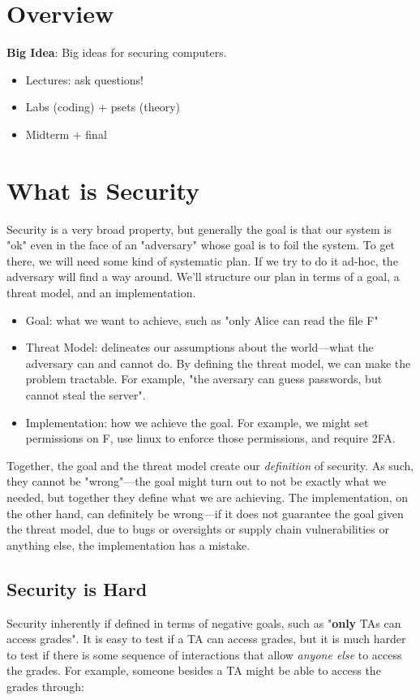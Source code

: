 \section{Overview}
\textbf{Big Idea}: Big ideas for securing computers.
\begin{itemize}
	\item Lectures: ask questions!
	\item Labs (coding) + psets (theory)
	\item Midterm + final
\end{itemize}

\section{What is Security}
Security is a very broad property, but generally the goal is that our system is "ok" even in the face of an "adversary" whose goal is to foil the system. To get there, we will need some kind of systematic plan. If we try to do it ad-hoc, the adversary will find a way around. We'll structure our plan in terms of a goal, a threat model, and an implementation.

\begin{itemize}
	\item Goal: what we want to achieve, such as "only Alice can read the file F"
	\item Threat Model: delineates our assumptions about the world---what the adversary can and cannot do. By defining the threat model, we can make the problem tractable. For example, "the aversary can guess passwords, but cannot steal the server".
	\item Implementation: how we achieve the goal. For example, we might set permissions on F, use linux to enforce those permissions, and require 2FA.
\end{itemize}

Together, the goal and the threat model create our \textit{definition} of security. As such, they cannot be "wrong"---the goal might turn out to not be exactly what we needed, but together they define what we are achieving. The implementation, on the other hand, can definitely be wrong---if it does not guarantee the goal given the threat model, due to bugs or oversights or supply chain vulnerabilities or anything else, the implementation has a mistake.

\subsection{Security is Hard}
Security inherently if defined in terms of negative goals, such as "\textbf{only} TAs can access grades". It is easy to test if a TA can access grades, but it is much harder to test if there is some sequence of interactions that allow \textit{anyone else} to access the grades. For example, someone besides a TA might be able to access the grades through:

